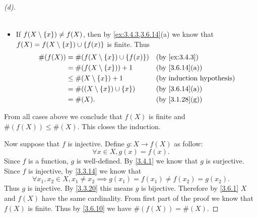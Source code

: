 \begin{proof}[(d)]
\begin{itemize}
\begin{align*}
		      \end{align*}
		\item If \(f(X \setminus \left\lbrace x\right\rbrace) \neq f(X)\), then by \cref{ex:3.4.3,3.6.14}(a) we know that \(f(X) = f(X \setminus \left\lbrace x\right\rbrace) \cup \left\lbrace f(x)\right\rbrace\) is finite.
		      Thus
		      \begin{align*}
			      \#(f(X)) & = \#(f(X \setminus \set{x}) \cup \set{f(x)}) &  & \by{ex:3.4.3}                \\
			               & = \#(f(X \setminus \set{x})) + 1             &  & \text{(by \cref{3.6.14}(a))} \\
			               & \leq \#(X \setminus \set{x}) + 1             &  & \byIH                        \\
			               & = \#((X \setminus \set{x}) \cup \set{x})     &  & \text{(by \cref{3.6.14}(a))} \\
			               & = \#(X).                                     &  & \text{(by \cref{3.1.28}(g))}
		      \end{align*}
	\end{itemize}
	From all cases above we conclude that \(f(X)\) is finite and \(\#(f(X)) \leq \#(X)\).
	This closes the induction.

	Now suppose that \(f\) is injective.
	Define \(g : X \to f(X)\) as follow:
	\[
		\forall x \in X, g(x) = f(x).
	\]
	Since \(f\) is a function, \(g\) is well-defined.
	By \cref{3.4.1} we know that \(g\) is surjective.
	Since \(f\) is injective, by \cref{3.3.14} we know that
	\[
		\forall x_1, x_2 \in X, x_1 \neq x_2 \implies g(x_1) = f(x_1) \neq f(x_2) = g(x_2).
	\]
	Thus \(g\) is injective.
	By \cref{3.3.20} this means \(g\) is bijective.
	Therefore by \cref{3.6.1} \(X\) and \(f(X)\) have the same cardinality.
	From first part of the proof we know that \(f(X)\) is finite.
	Thus by \cref{3.6.10} we have \(\#(f(X)) = \#(X)\).
\end{proof}


